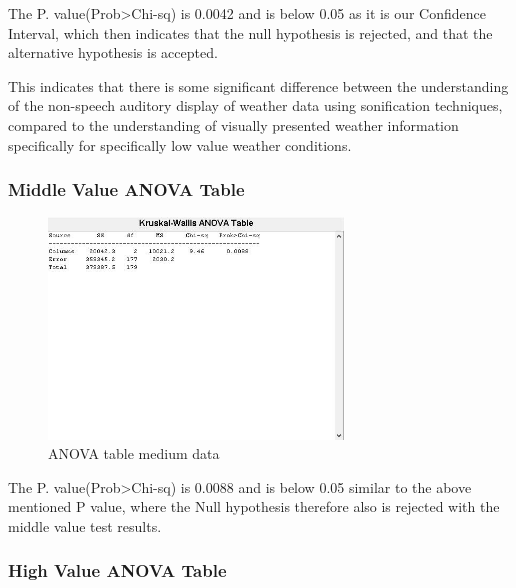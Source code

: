 The P. value(Prob>Chi-sq) is 0.0042 and is below 0.05 as it is our Confidence Interval, which then indicates that the null hypothesis is rejected, and that the alternative hypothesis is accepted.

This indicates that there is some significant difference between the understanding of the non-speech auditory display of weather data using sonification techniques, compared to the understanding of visually presented weather information specifically for specifically low value weather conditions.


\subsubsection*{Middle Value ANOVA Table} %
\label{ssub:middle_value_anova_table}

\begin{figure}[!htbp]
    \centering
    \includegraphics[width=0.7\textwidth]{images/Evaluation5.jpg}
    \caption{ANOVA table medium data}
    \label{fig:evaluation5}
\end{figure}

The P. value(Prob>Chi-sq) is 0.0088 and is below 0.05 similar to the above mentioned P value, where the Null hypothesis therefore also is rejected with the middle value test results.



\subsubsection*{High Value ANOVA Table} %
\label{ssub:high_value_anova_table}


